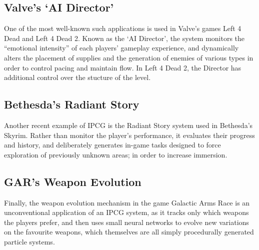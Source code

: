 \documentclass[a4paper,oneside,12pt,openany]{memoir}
\begin{document}
\subsection{Valve's `AI Director'}
One of the most well-known such applications is used in Valve's games Left 4 Dead and Left 4 Dead 2. Known as the `AI Director', the system monitors the ``emotional intensity'' of each players' gameplay experience, and dynamically alters the placement of supplies and the generation of enemies of various types in order to control pacing and maintain flow. In Left 4 Dead 2, the Director has additional control over the stucture of the level\cite{valve}.
\subsection{Bethesda's Radiant Story}
Another recent example of IPCG is the Radiant Story system used in Bethesda's Skyrim. Rather than monitor the player's performance, it evaluates their progress and history, and deliberately generates in-game tasks designed to force exploration of previously unknown areas; in order to increase immersion\cite{radiant}. 
\subsection{GAR's Weapon Evolution}
Finally, the weapon evolution mechanism in the game Galactic Arms Race\cite{garmsr} is an unconventional application of an IPCG system, as it tracks only which weapons the players prefer, and then uses small neural networks to evolve new variations on the favourite weapons, which themselves are all simply procedurally generated particle systems\cite{Hastings:2009:IEP:1650356.1650369}.
\end{document}

